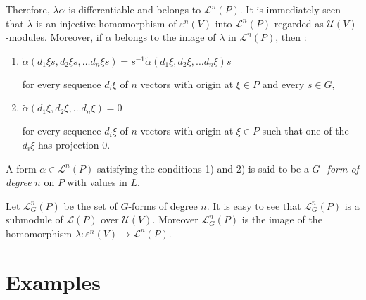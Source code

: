 Therefore, $\lambda \alpha$ is differentiable and belongs to
$\mathscr{L}^n (P)$. It is immediately seen that $\lambda$ is an
injective homomorphism of $\varepsilon^n(V)$ into $\mathscr{L}^n (P)$
regarded as $\mathscr{U}(V)$-modules. Moreover, if $\tilde{\alpha}$
belongs to the image of $\lambda$ in $\mathscr{L}^n (P)$, then : 
\begin{enumerate}[1)]
\item  $\tilde{\alpha} (d_1 \xi s , d_2 \xi s , \ldots d_n \xi s) =
  s^{-1} \tilde{\alpha}(d_1 \xi , d_2 \xi , \ldots d_n \xi) s$ 

  for every sequence $d_i \xi$ of $n$ vectors with origin at $\xi \in
  P$ and every $s \in G$, 
\item \qquad $\tilde{\alpha} (d_1 \xi , d_2 \xi , \ldots d_n \xi) = 0$

  for every sequence $d_i \xi$ of $n$ vectors with origin at $\xi \in
  P$ such that one of the $d_i \xi$ has projection $0$. 
\end{enumerate}

\begin{defn}\label{chap5:sec8:def6}%
  A form $\alpha \in \mathscr{L}^n (P)$ satisfying the conditions 1)
  and 2) is said to be a {\em $G$- form of degree} $n$ on $P$ with
  values in $L$. 
\end{defn}

Let $\mathscr{L}^n_G (P)$ be the set of $G$-forms of degree $n$. It is
easy to see that $\mathscr{L}^n_G (P)$ is a submodule of
$\mathscr{L}(P)$ over $\mathscr{U}(V)$. Moreover $\mathscr{L}^n_G(P)$
is the image of the homomorphism $\lambda : \varepsilon^n (V) \to
\mathscr{L}^n (P)$. 

\section{Examples}\label{chap5:sec9}%

